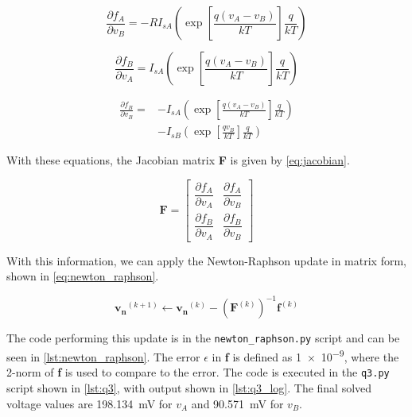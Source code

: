 \documentclass[a4paper,titlepage]{article}
\newcommand{\code}[1]{\texttt{#1}}
\begin{document}
	\begin{equation} \label{eq:jacobian_12}
		\frac{\partial f_A}{\partial v_B} = - R I_{sA} \left( \exp\left[{\frac{q(v_A - v_B)}{kT}}\right]\frac{q}{kT}\right)
	\end{equation}
	
	\begin{equation} \label{eq:jacobian_21}
		\frac{\partial f_B}{\partial v_A} = I_{sA} \left( \exp\left[{\frac{q(v_A - v_B)}{kT}}\right]\frac{q}{kT}\right)
	\end{equation}
	
	\begin{equation} \label{eq:jacobian_22}
	\begin{split}
		\frac{\partial f_B}{\partial v_B} = &-I_{sA} \left( \exp\left[{\frac{q(v_A - v_B)}{kT}}\right]\frac{q}{kT}\right) \\
		&- I_{sB} \left( \exp\left[{\frac{qv_B}{kT}}\right]\frac{q}{kT}\right)
	\end{split}
	\end{equation}
	
	With these equations, the Jacobian matrix \textbf{F} is given by \cref{eq:jacobian}.
	
	\begin{equation} \label{eq:jacobian}
		\textbf{F} = 
		\begin{bmatrix}
		\dfrac{\partial f_A}{\partial v_A} & \dfrac{\partial f_A}{\partial v_B} \\[2ex]
		\dfrac{\partial f_B}{\partial v_A} & \dfrac{\partial f_B}{\partial v_B}
		\end{bmatrix}
	\end{equation}
	
	With this information, we can apply the Newton-Raphson update in matrix form, shown in \cref{eq:newton_raphson}.
	
	\begin{equation} \label{eq:newton_raphson}
		\mathbf{v_n}^{(k + 1)} \leftarrow \mathbf{v_n}^{(k)} - (\mathbf{F}^{(k)})^{-1} \mathbf{f}^{(k)}
	\end{equation}
	
	The code performing this update is in the \code{newton\_raphson.py} script and can be seen in \cref{lst:newton_raphson}. The error $\epsilon$ in \textbf{f} is defined as \SI{1e-9}{}, where the 2-norm of \textbf{f} is used to compare to the error. The code is executed in the \code{q3.py} script shown in \cref{lst:q3}, with output shown in \cref{lst:q3_log}. The final solved voltage values are \SI{198.134}{\milli\volt} for $v_A$ and \SI{90.571}{\milli\volt} for $v_B$.
	
\end{document}
